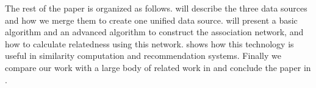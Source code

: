 The rest of the paper is organized as follows.
 will describe the three data sources and how we merge
them to create one unified data source.  will
present a basic algorithm and an advanced algorithm to construct
the association network, and how to calculate relatedness using this network.
 shows how this technology is useful in similarity
computation and recommendation systems. Finally we compare our work with
a large body of related work in  and conclude the paper
in .

